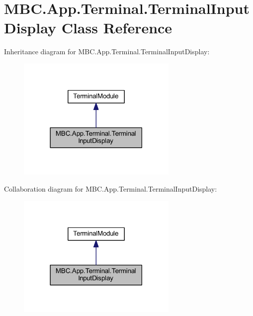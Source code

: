 \hypertarget{class_m_b_c_1_1_app_1_1_terminal_1_1_terminal_input_display}{\section{M\-B\-C.\-App.\-Terminal.\-Terminal\-Input\-Display Class Reference}
\label{class_m_b_c_1_1_app_1_1_terminal_1_1_terminal_input_display}
}


Inheritance diagram for M\-B\-C.\-App.\-Terminal.\-Terminal\-Input\-Display\-:
\nopagebreak
\begin{figure}[H]
\begin{center}
\leavevmode
\includegraphics[width=218pt]{class_m_b_c_1_1_app_1_1_terminal_1_1_terminal_input_display__inherit__graph}
\end{center}
\end{figure}


Collaboration diagram for M\-B\-C.\-App.\-Terminal.\-Terminal\-Input\-Display\-:
\nopagebreak
\begin{figure}[H]
\begin{center}
\leavevmode
\includegraphics[width=218pt]{class_m_b_c_1_1_app_1_1_terminal_1_1_terminal_input_display__coll__graph}
\end{center}
\end{figure}
